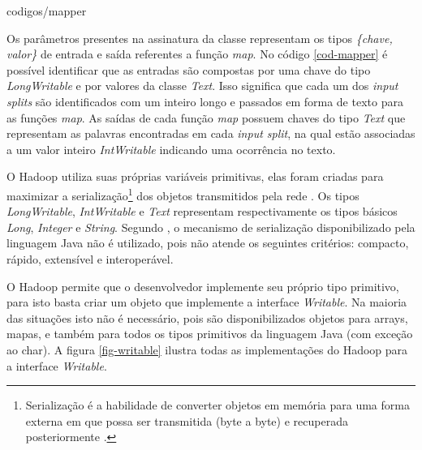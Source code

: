 
		{codigos/mapper}

Os parâmetros presentes na assinatura da classe representam os tipos \textit{\{chave, valor\}} de entrada e saída referentes a função \textit{map}. No código \ref{cod-mapper} é possível identificar que as entradas são compostas por uma chave do tipo \textit{LongWritable} e por valores da classe \textit{Text}. Isso significa que cada um dos \textit{input splits} são identificados com um inteiro longo e passados em forma de texto para as funções \textit{map}. As saídas de cada função \textit{map} possuem chaves do tipo \textit{Text} que representam as palavras encontradas em cada \textit{input split}, na qual estão associadas a um valor inteiro \textit{IntWritable} indicando uma ocorrência no texto.

O Hadoop utiliza suas próprias variáveis primitivas, elas foram criadas para maximizar a serialização\footnote{Serialização é a habilidade de converter objetos em memória para uma forma externa em que possa ser transmitida (byte a byte) e recuperada posteriormente \cite{darwin2014}.} dos objetos transmitidos pela rede \cite{white2012}. Os tipos \textit{LongWritable}, \textit{IntWritable} e \textit{Text} representam respectivamente os tipos básicos \textit{Long}, \textit{Integer} e \textit{String}. Segundo , o mecanismo de serialização disponibilizado pela linguagem Java não é utilizado, pois não atende os seguintes critérios: compacto, rápido, extensível e interoperável.

O Hadoop permite que o desenvolvedor implemente seu próprio tipo primitivo, para isto basta criar um objeto que implemente a interface \textit{Writable}. Na maioria das situações isto não é necessário, pois são disponibilizados objetos para arrays, mapas, e também para todos os tipos primitivos da linguagem Java (com exceção ao char). A figura \ref{fig-writable} ilustra todas as implementações do Hadoop para a interface \textit{Writable}.

